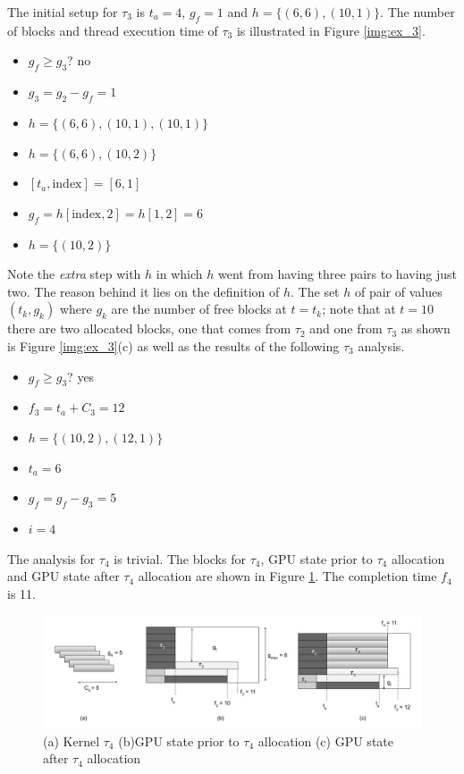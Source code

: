 \documentclass[
  12pt,
  a4paperpaper,
]{report}
\providecommand{\tightlist}{%
  \setlength{\itemsep}{0pt}\setlength{\parskip}{0pt}}
\begin{document}
The initial setup for \(\tau_3\) is \(t_a = 4\), \(g_f= 1\) and
\(h = \{ (6,6),(10,1) \}\). The number of blocks and thread execution
time of \(\tau_3\) is illustrated in Figure \ref{img:ex_3}.

\begin{itemize}
\tightlist
\item
  \(g_f \geq g_3\)? no
\item
  \(g_3 = g_2 - g_f = 1\)
\item
  \(h = \{ (6,6), (10,1), (10,1) \}\)
\item
  \(h = \{ (6,6), (10,2) \}\)
\item
  \([ t_a, \mathrm{index} ] = [6,1]\)
\item
  \(g_f = h[ \mathrm{index},2] = h[1,2] = 6\)
\item
  \(h = \{(10,2)\}\)
\end{itemize}

Note the \emph{extra} step with \(h\) in which
\(h\) went from having three pairs to having just two. The reason behind
it lies on the definition of \(h\). The set \(h\) of pair of values
\((t_k, g_k)\) where \(g_k\) are the number of free blocks at \(t=t_k\);
note that at \(t=10\) there are two allocated blocks, one
that comes from \(\tau_2\) and one from \(\tau_3\) as shown is Figure
\ref{img:ex_3}(c) as well as the results of the following \(\tau_3\)
analysis.

\begin{itemize}
\tightlist
\item
  \(g_f \geq g_3\)? yes
\item
  \(f_3 = t_a + C_3 = 12\)
\item
  \(h = \{ (10,2),(12,1) \}\)
\item
  \(t_a = 6\)
\item
  \(g_f = g_f - g_3 = 5\)
\item
  \(i = 4\)
\end{itemize}

The analysis for \(\tau_4\) is trivial. The blocks for \(\tau_4\), GPU state prior to \(\tau_4\) allocation and GPU state after \(\tau_4\) allocation are shown in Figure \ref{img:ex_4}. 
The completion time \(f_4\) is 11.

\begin{figure}
\centering
\includegraphics{source/figures/ex_4.jpg}
\caption{(a) Kernel \(\tau_4\) (b)GPU state prior to \(\tau_4\)
allocation (c) GPU state after \(\tau_4\) allocation \label{img:ex_4}}
\end{figure}
\end{document}
